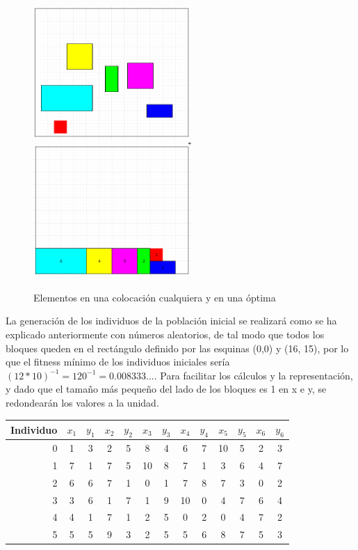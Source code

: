\documentclass[a4paper]{article}
\begin{document}
\begin{figure}[h]
\begin{center}
\includegraphics[width=6cm]{./pics/elements.png}
\includegraphics[width=6cm]{./pics/optimal.png}
\end{center}
\caption{Elementos en una colocación cualquiera y en una óptima}
\end{figure}

La generación de los individuos de la población inicial se realizará como se ha explicado anteriormente con números aleatorios, de tal modo que todos los bloques queden en el rectángulo definido por las esquinas (0,0) y (16, 15), por lo que el fitness mínimo de los individuos iniciales sería $(12*10)^{-1} = 120^{-1} = 0.008333...$. Para facilitar los cálculos y la representación, y dado que el tamaño más pequeño del lado de los bloques es 1 en x e y, se redondearán los valores a la unidad.

\begin{center}
\begin{tabular}{r|c c|c c|c c|c c|c c|c c}
Individuo & $x_1$ & $y_1$ & $x_2$ & $y_2$ & $x_3$ & $y_3$ & $x_4$ & $y_4$ & $x_5$ & $y_5$ & $x_6$ & $y_6$ \\ \hline
0 & 1 & 3 & 2 & 5 & 8  & 4 & 6  & 7 & 10 & 5 & 2 & 3 \\
1 & 7 & 1 & 7 & 5 & 10 & 8 & 7  & 1 & 3  & 6 & 4 & 7 \\
2 & 6 & 6 & 7 & 1 & 0  & 1 & 7  & 8 & 7  & 3 & 0 & 2 \\
3 & 3 & 6 & 1 & 7 & 1  & 9 & 10 & 0 & 4  & 7 & 6 & 4 \\
4 & 4 & 1 & 7 & 1 & 2  & 5 & 0  & 2 & 0  & 4 & 7 & 2 \\
5 & 5 & 5 & 9 & 3 & 2  & 5 & 5  & 6 & 8  & 7 & 5 & 3 \\
\end{tabular}
\end{center}
\end{document}
